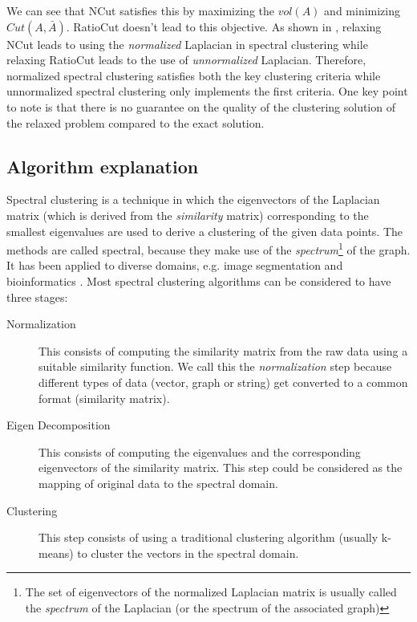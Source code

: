 We can see that NCut satisfies this by maximizing the $vol(A)$ and minimizing $Cut(A,\bar{A})$. RatioCut doesn't lead to this objective. As shown in \citet{luxberg2006tutorial_spectral}, relaxing NCut leads to using the \textit{normalized} Laplacian in spectral clustering while relaxing RatioCut leads to the use of \textit{unnormalized} Laplacian. Therefore, normalized spectral clustering satisfies both the key clustering criteria while unnormalized spectral clustering only implements the first criteria. One key point to note is that there is no guarantee on the quality of the clustering solution of the relaxed problem compared to the exact solution. 

\subsection{Algorithm explanation}
Spectral clustering is a technique in which the eigenvectors of the Laplacian matrix (which is derived from the \textit{similarity} matrix) corresponding to the smallest eigenvalues are used to derive a clustering of the given data points. The methods are called spectral, because they make use of the \textit{spectrum}\footnote{The set of eigenvectors of the normalized Laplacian matrix is usually called the \textit{spectrum} of the Laplacian (or the spectrum of the associated graph)} of the graph. It has been applied to diverse domains, e.g. image segmentation \citep{shi00normalized, weiss1999segmentation} and bioinformatics \citep{speer05spectral}. Most spectral clustering algorithms can be considered to have three stages:
\begin{description}
    \item[Normalization] This consists of computing the similarity matrix from the raw data using a suitable similarity function. We call this the \textit{normalization} step because different types of data (vector, graph or string) get converted to a common format (similarity matrix).
    \item[Eigen Decomposition] This consists of computing the eigenvalues and the corresponding eigenvectors of the similarity matrix. This step could be considered as the mapping of original data to the spectral domain.
    \item[Clustering] This step consists of using a traditional clustering algorithm (usually k-means) to cluster the vectors in the spectral domain.	
\end{description}
